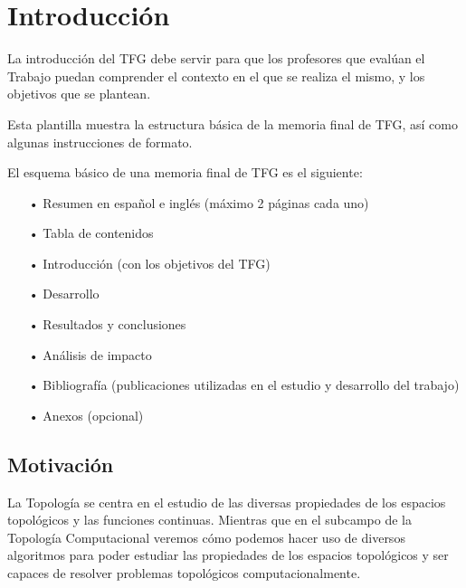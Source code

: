 \chapter{Introducción}
La introducción del TFG debe servir para que los profesores que evalúan el Trabajo puedan comprender el contexto en el que se realiza el mismo, y los objetivos que se plantean.

Esta plantilla muestra la estructura básica de la memoria final de TFG, así como algunas instrucciones de formato.

El esquema básico de una memoria final de TFG es el siguiente:
\begin{itemize}
\item[•] Resumen en español e inglés (máximo 2 páginas cada uno)
\item[•] Tabla de contenidos
\item[•] Introducción (con los objetivos del TFG)
\item[•] Desarrollo
\item[•] Resultados y conclusiones
\item[•] Análisis de impacto
\item[•] Bibliografía (publicaciones utilizadas en el estudio y desarrollo del trabajo)
\item[•] Anexos (opcional)
\end{itemize}


\section{Motivación}
La Topología se centra en el estudio de las diversas propiedades de los espacios topológicos y las funciones continuas. Mientras que en el subcampo de la Topología Computacional veremos cómo podemos hacer uso de diversos algoritmos para poder estudiar las propiedades de los espacios topológicos y ser capaces de resolver problemas topológicos computacionalmente.